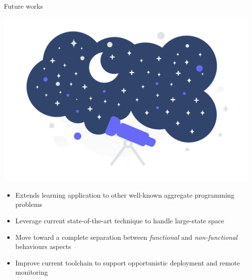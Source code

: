 \begin{frame}{Future works}
  \begin{backgroundblock} 
    \includegraphics[width=\paperwidth]{img/conclusion} 
  \end{backgroundblock} 
  \begin{card}
    \begin{itemize}
      \item Extends learning application to other well-known aggregate programming problems
      \item Leverage current state-of-the-art technique to handle large-state space
    \end{itemize}
  \end{card}
  \begin{card}
    \begin{itemize}
      \item Move toward a complete separation between \textit{functional} and \textit{non-functional} behaviours aspects
      \item Improve current toolchain to support opportunistic deployment and remote monitoring
    \end{itemize}
  \end{card}

\end{frame}